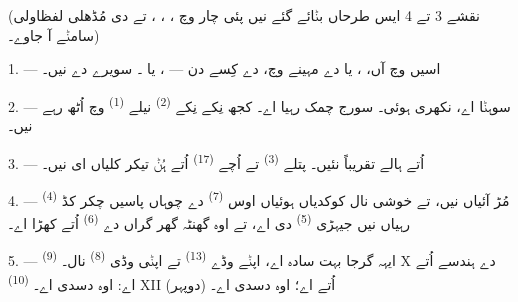 %

\VUsaut{3.0mm}
\VUsaut{1.6mm}
\VUsaut{3.4mm}

(نقشے 3 تے 4 ایس طرحاں بݨائے گئے نیں پئی چار  وچ
، ، ،  تے  دی
مُڈھلی لفظاولی سامݨے آ جاوے۔)
\VUsaut{4.0mm}

\VUsaut{3.0mm}

\VUsaut{2.4mm}

\VUsaut{3.0mm}

1. --- اسیں  وچ آں، ،  یا 
دے مہینے وچ،  دے کِسے دن --- ،  یا
۔ سویرے دے  نیں۔

2. ---  سوہݨا اے،  نکھری ہوئی۔ سورج چمک رہیا اے۔ کجھ
نِکے نِکے  \textsuperscript{(2)} نیلے 
\textsuperscript{(1)} وچ اُٹھ رہے نیں۔

3. ---  اُتے ہالے  تقریباً نئیں۔ پتلے
 \textsuperscript{(3)} تے اُچے  \textsuperscript{(17)}
اُتے ہُݨ تیکر کلیاں ای نیں۔

4. ---  \textsuperscript{(4)} مُڑ آئیاں نیں، تے خوشی نال کوکدیاں
ہوئیاں اوس  \textsuperscript{(7)} دے چوہاں پاسیں چکر کڈ رہیاں نیں
جیہڑی  \textsuperscript{(5)} دی اے، تے اوہ گھنٹہ گھر گراں دے
 \textsuperscript{(6)} اُتے کھڑا اے۔

\VUsaut{3.4mm}
\VUsaut{3.0mm}

5. --- ایہہ گرجا بہت سادہ اے، اپݨے وڈے  \textsuperscript{(13)} تے
اپݨی وڈی  \textsuperscript{(8)} نال۔ 
\textsuperscript{(9)} X دے ہندسے اُتے اے: اوہ  دسدی اے۔
 \textsuperscript{(10)} XII (دوپہر) اُتے اے؛ اوہ 
دسدی اے۔

